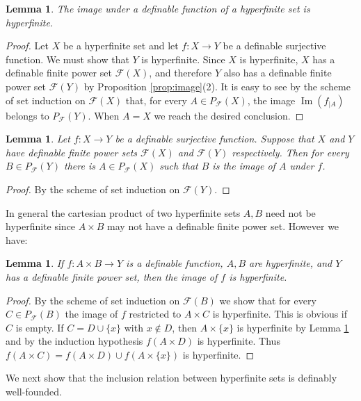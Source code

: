 \documentclass{amsart}
\newcommand{\ca}{\mathcal}
\newcommand{\img}{\operatorname{Im}}
\newcommand{\nin}{\not \in}
\theoremstyle{plain}
\newtheorem{lem}[thm]{Lemma}
\theoremstyle{definition}
\newcommand{\F}{\mathcal{F}}
\newcommand{\pF}{P_{\ca F}}
\begin{document}
\begin{lem}\label{lem:projection}
     The image under a definable function of a hyperfinite set is hyperfinite.
\end{lem}

\begin{proof}
    Let $X$ be a hyperfinite set and let $f:X\to Y$ be a definable surjective function. We must show that $Y$ is hyperfinite. Since $X$ is hyperfinite, $X$ has a definable finite power set $\F(X)$, and therefore $Y$ also has a definable finite power set $\F(Y)$ by Proposition \ref{prop:image}(2). It is easy to see by the scheme of set induction on $\F(X)$ that, for every $A\in \pF(X)$, the image $\img (f_{|A})$ belongs to $\pF(Y)$. When $A = X$ we reach the desired conclusion.  
\end{proof}

\begin{lem}\label{lem:image}
Let $f:X\to Y$ be a definable surjective function. Suppose that $X$ and $Y$ have definable finite power sets $\F(X)$ and $\F(Y)$ respectively. Then for every $B \in \pF(Y)$ there is $A\in \pF(X)$ such that $B$ is the image of $A$ under $f$. \end{lem}
\begin{proof}
    By the scheme of set induction on $\F(Y)$. 
\end{proof}

In general the cartesian product of two hyperfinite sets $A,B$ need not be hyperfinite since $A\times B$ may not have a definable finite power set. However we have: 

\begin{lem}\label{lem:image-of-product}
    If $f:A\times B \to Y$ is a definable function, $A,B$ are hyperfinite, and $Y$ has a definable finite power set, then the image of $f$ is hyperfinite. 
\end{lem}
\begin{proof}
    By the scheme of set induction on $\F(B)$ we show that for every $C\in \pF(B)$ the image of $f$ restricted to $A\times C$ is hyperfinite. This is obvious if $C$ is empty. If $C = D \cup \{x\}$ with $x\nin D$, then $A \times \{x\}$ is hyperfinite by Lemma \ref{lem:projection} and by the induction hypothesis $f(A\times D)$ is hyperfinite. Thus $f(A\times C) = f(A \times D) \cup f(A \times \{x\})$ is hyperfinite. 
\end{proof}

We next show that the inclusion relation between hyperfinite sets is definably well-founded. 
\end{document}
